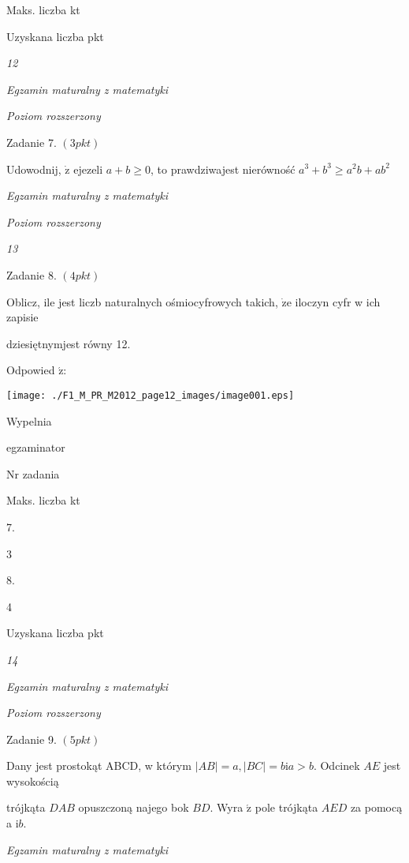 \documentclass[a4paper,12pt]{article}
\begin{document}
Maks. liczba kt

Uzyskana liczba pkt





{\it 12}

{\it Egzamin maturalny z matematyki}

{\it Poziom rozszerzony}

Zadanie 7. $(3pkt)$

Udowodnij, $\dot{\mathrm{z}}$ ejezeli $a+b\geq 0$, to prawdziwajest nierówność $a^{3}+b^{3}\geq a^{2}b+ab^{2}$





{\it Egzamin maturalny z matematyki}

{\it Poziom rozszerzony}

{\it 13}

Zadanie 8. $(4pkt)$

Oblicz, ile jest liczb naturalnych ośmiocyfrowych takich, $\dot{\mathrm{z}}\mathrm{e}$ iloczyn cyfr w ich zapisie

dziesiętnymjest równy 12.

Odpowied $\acute{\mathrm{z}}$:
\begin{center}
\texttt{[image: ./F1\_M\_PR\_M2012\_page12\_images/image001.eps]}
\end{center}
Wypelnia

egzaminator

Nr zadania

Maks. liczba kt

7.

3

8.

4

Uzyskana liczba pkt





{\it 14}

{\it Egzamin maturalny z matematyki}

{\it Poziom rozszerzony}

Zadanie 9. $(5pkt)$

Dany jest prostokąt ABCD, w którym $|AB|=a, |BC|=b \mathrm{i}a>b$. Odcinek $AE$ jest wysokością

trójkąta $DAB$ opuszczoną najego bok $BD.$ Wyra $\acute{\mathrm{z}}$ pole trójkąta $AED$ za pomocą a $\mathrm{i}b.$





{\it Egzamin maturalny z matematyki}
\end{document}
